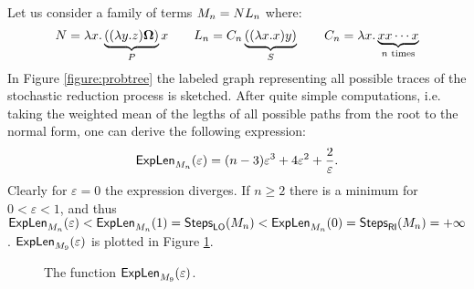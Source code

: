 \begin{example}
	Let us consider a family of terms $M_n=NL_n$ where:
	$$
	N = \lambda x.\underbrace{((\lambda y.z)\bm{\Omega})}_P x\qquad
	L_n = C_n\underbrace{((\lambda x.x)y)}_S\qquad
	C_n = \lambda  x.\underbrace{xx\cdots x}_{n\text{ times}}
	$$
	In Figure \ref{figure:probtree} the labeled graph representing all possible traces of the stochastic reduction process is sketched. After quite simple computations, i.e. taking the weighted mean of the legths of all possible paths from the root to the normal form, one can derive the following expression: 
	$$
	\textsf{ExpLen}_{M_n}(\varepsilon)=(n-3)\varepsilon^3+4\varepsilon^2+\frac{2}{\varepsilon}.
	$$
	Clearly for $\varepsilon=0$ the expression diverges. If $n\geq 2$ there is a minimum for $0<\varepsilon<1$, and thus $\textsf{ExpLen}_{M_n}(\varepsilon) <\textsf{ExpLen}_{M_n}(1)=\textsf{Steps}_{\textsf{LO}}(M_n) <\textsf{ExpLen}_{M_n}(0)= \textsf{Steps}_{\textsf{RI}}(M_n)=+\infty$. $\textsf{ExpLen}_{M_9}(\varepsilon)$ is plotted in Figure \ref{figure:plot}.
	\begin{figure}
		\caption{The function $\textsf{ExpLen}_{M_9}(\varepsilon)$.}
		\label{figure:plot}
	\end{figure}
\end{example}

